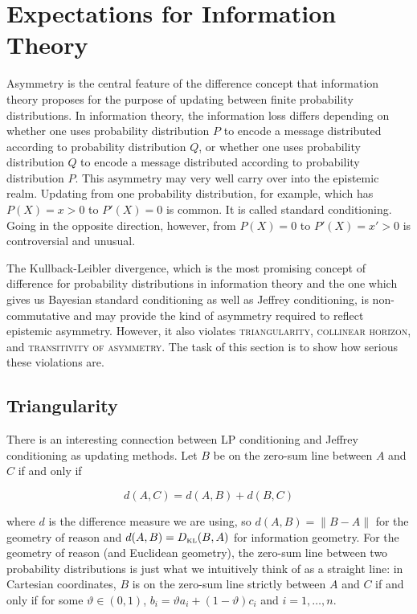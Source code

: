 \documentclass[smallextended]{svjour3}       %
\begin{document}
\section{Expectations for Information Theory}
\label{sec:expinfth}

Asymmetry is the central feature of the difference concept that
information theory proposes for the purpose of updating between finite
probability distributions. In information theory, the information loss
differs depending on whether one uses probability distribution $P$ to
encode a message distributed according to probability distribution
$Q$, or whether one uses probability distribution $Q$ to encode a
message distributed according to probability distribution $P$. This
asymmetry may very well carry over into the epistemic realm. Updating
from one probability distribution, for example, which has $P(X)=x>0$
to $P'(X)=0$ is common. It is called standard conditioning. Going in
the opposite direction, however, from $P(X)=0$ to $P'(X)=x'>0$ is
controversial and unusual.

The Kullback-Leibler divergence, which is the most promising concept
of difference for probability distributions in information theory and
the one which gives us Bayesian standard conditioning as well as
Jeffrey conditioning, is non-commutative and may provide the kind of
asymmetry required to reflect epistemic asymmetry. However, it also
violates \textsc{triangularity}, \textsc{collinear horizon}, and
\textsc{transitivity of asymmetry}. The task of this section is to
show how serious these violations are.

\subsection{Triangularity}
\label{subsec:triangularity}

There is an interesting connection between LP conditioning and Jeffrey
conditioning as updating methods. Let $B$ be on the zero-sum line
between $A$ and $C$ if and only if

\begin{equation}
\label{eq:jooziphu}
d(A,C)=d(A,B)+d(B,C)
\end{equation}

where $d$ is the difference measure we are using, so $d(A,B)=\|B-A\|$
for the geometry of reason and $d(A,B)=D_{\mbox{\tiny KL}}(B,A)$ for
information geometry. For the geometry of reason (and Euclidean
geometry), the zero-sum line between two probability distributions is
just what we intuitively think of as a straight line: in Cartesian
coordinates, $B$ is on the zero-sum line strictly between $A$ and $C$
if and only if for some $\vartheta\in(0,1)$,
$b_{i}=\vartheta{}a_{i}+(1-\vartheta)c_{i}$ and $i=1,\ldots,n$.
\end{document}
